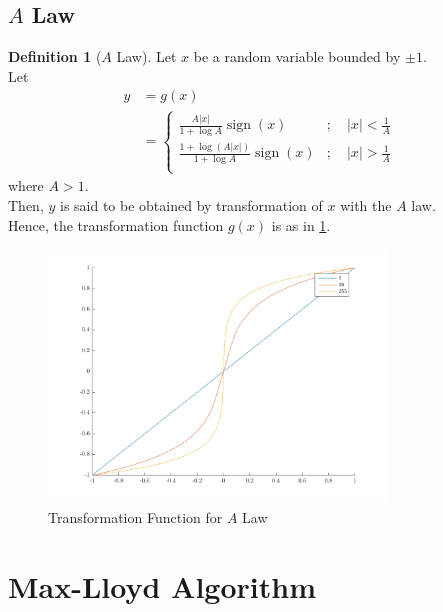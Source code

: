 \documentclass[titlepage, fleqn, a4paper, 12pt, twoside]{article}
\theoremstyle{definition}
\newtheorem{definition}{Definition}
\theoremstyle{theorem}
\DeclareMathOperator{\sign}{\mathrm{sign}}
\begin{document}
\subsection{$A$ Law}

\begin{definition}[$A$ Law]
	Let $x$ be a random variable bounded by $\pm 1$.\\
	Let
	\begin{align*}
		y &= g(x)\\
		&=
			\begin{cases}
				\frac{A |x|}{1 + \log A} \sign(x) &;\quad |x| < \frac{1}{A}\\
				\frac{1 + \log\left( A |x| \right)}{1 + \log A} \sign(x) &;\quad |x| > \frac{1}{A}\\
			\end{cases}
	\end{align*}
	where $A > 1$.\\
	Then, $y$ is said to be obtained by transformation of $x$ with the $A$ law.\\
	Hence, the transformation function $g(x)$ is as in \cref{fig:transformation_function_for_A_law}.
	\begin{figure}[H]
		\centering
		\includegraphics[width = 0.8\textwidth]{./Plots/A_law.pdf}
		\caption{Transformation Function for $A$ Law}
		\label{fig:transformation_function_for_A_law}
	\end{figure}
	\label{def:A_law}
\end{definition}

\section{Max-Lloyd Algorithm}
\end{document}
